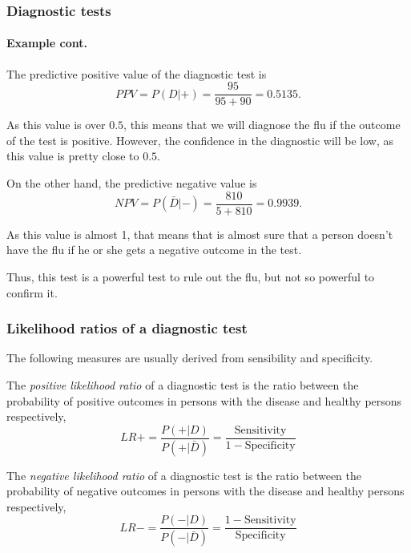 \begin{frame}
\frametitle{Diagnostic tests}
\framesubtitle{Example cont.}
The predictive positive value of the diagnostic test is
\[
PPV = P(D|+) = \frac{95}{95+90} = 0.5135.
\]

As this value is over $0.5$, this means that we will diagnose the flu if the outcome of the test is positive. 
However, the confidence in the diagnostic will be low, as this value is pretty close to $0.5$.

On the other hand, the predictive negative value is 
\[
NPV = P(\bar D|-) = \frac{810}{5+810} = 0.9939. 
\]

As this value is almost 1, that means that is almost sure that a person doesn't have the flu if he or she gets a
negative outcome in the test. 

Thus, this test is a powerful test to rule out the flu, but not so powerful to confirm it.    
\end{frame}


\begin{frame}
\frametitle{Likelihood ratios of a diagnostic test}
The following measures are usually derived from sensibility and specificity.
\begin{definition}
The \emph{positive likelihood ratio} of a diagnostic test is the ratio between the probability of positive outcomes in
persons with the disease and healthy persons respectively,
\[
LR+=\frac{P(+|D)}{P(+|\bar D)} = \frac{\mbox{Sensitivity}}{1-\mbox{Specificity}}
\]
\end{definition}

\begin{definition}
The \emph{negative likelihood ratio} of a diagnostic test is the ratio between the probability of negative outcomes in
persons with the disease and healthy persons respectively,
\[
LR-=\frac{P(-|D)}{P(-|\bar D)} = \frac{1-\mbox{Sensitivity}}{\mbox{Specificity}}
\]
\end{definition}
\end{frame}


